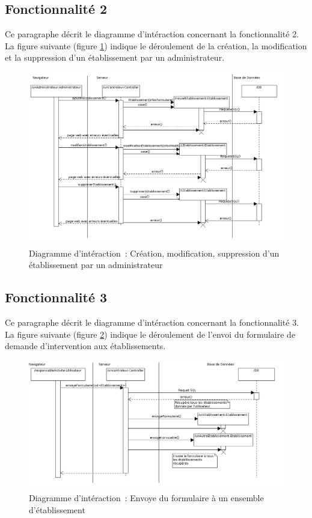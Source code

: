 \subsection{Fonctionnalité 2}
Ce paragraphe décrit le diagramme d'intéraction concernant la fonctionnalité 2. \\

La figure suivante (figure \ref{diagrammeInteraction3}) indique le déroulement de la création, la modification et la suppression d'un établissement par un administrateur.
\begin{figure}[H]
	\centering
	\includegraphics[scale=0.5]{../../lot2/DCP/images/diagrammesInteraction/03_diagrammeInteractionF2.png}
	\caption{Diagramme d'intéraction~: Création, modification, suppression d'un établissement par un administrateur}
	\label{diagrammeInteraction3}
\end{figure}

\subsection{Fonctionnalité 3}
Ce paragraphe décrit le diagramme d'intéraction concernant la fonctionnalité 3. \\

La figure suivante (figure \ref{diagrammeInteraction4}) indique le déroulement de l'envoi du formulaire de demande d'intervention aux établissements.
\begin{figure}[H]
	\centering
	\includegraphics[scale=0.5]{../../lot2/DCP/images/diagrammesInteraction/04_diagrammeInteractionF3.png}
	\caption{Diagramme d'intéraction~: Envoye du formulaire à un ensemble d'établissement}
	\label{diagrammeInteraction4}
\end{figure}

